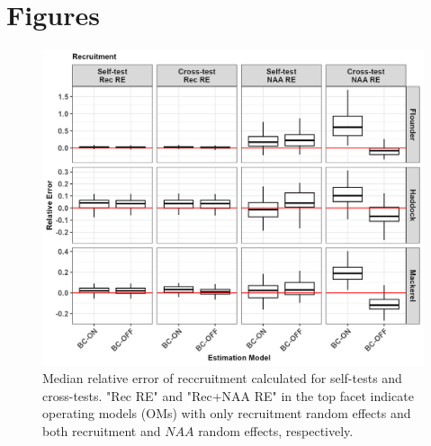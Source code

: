 \documentclass[
  12pt,
]{article}
\begin{document}


\section{Figures}\label{figures}

\begin{figure}[H]
\centering
\includegraphics[width=\textwidth]{Original_Figures&Tables/Median_Rec.PNG}
\caption{Median relative error of reccruitment calculated for self-tests and cross-tests. "Rec RE" and "Rec+NAA RE" in the top facet indicate operating models (OMs) with only recruitment random effects and both recruitment and $NAA$ random effects, respectively.}
\label{fig:Median_Rec}
\end{figure}
\end{document}
